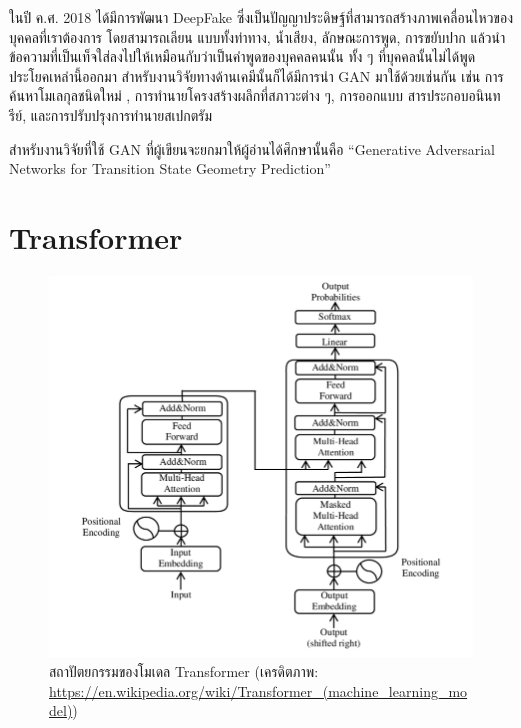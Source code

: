 ในปี ค.ศ. 2018 ได้มีการพัฒนา DeepFake ซึ่งเป็นปัญญาประดิษฐ์ที่สามารถสร้างภาพเคลื่อนไหวของบุคคลที่เราต้องการ โดยสามารถเลียน%
แบบทั้งท่าทาง, น้ำเสียง, ลักษณะการพูด, การขยับปาก แล้วนำข้อความที่เป็นเท็จใส่ลงไปให้เหมือนกับว่าเป็นคำพูดของบุคคลคนนั้น ทั้ง ๆ 
ที่บุคคลนั้นไม่ได้พูดประโยคเหล่านี้ออกมา สำหรับงานวิจัยทางด้านเคมีนั้นก็ได้มีการนำ GAN มาใช้ด้วยเช่นกัน เช่น การค้นหาโมเลกุลชนิดใหม่%
\autocite{prykhodko2019,lee2021,blanchard2021}, การทำนายโครงสร้างผลึกที่สภาวะต่าง ๆ\autocite{kim2020}, การออกแบบ%
สารประกอบอนินทรีย์\autocite{dan2020}, และการปรับปรุงการทำนายสเปกตรัม\autocite{al-mualem2022}

สำหรับงานวิจัยที่ใช้ GAN ที่ผู้เขียนจะยกมาให้ผู้อ่านได้ศึกษานั้นคือ \enquote{Generative Adversarial Networks for Transition State 
Geometry Prediction}\autocite{makos2021}

\section{Transformer}
\label{sec:transformer}

\begin{figure}[htbp]
    \centering
    \includegraphics[width=\linewidth]{fig/transformer.png}
    \caption{สถาปัตยกรรมของโมเดล Transformer 
    (เครดิตภาพ: \url{https://en.wikipedia.org/wiki/Transformer_(machine_learning_model)})}
    \label{fig:transformer}
\end{figure}

